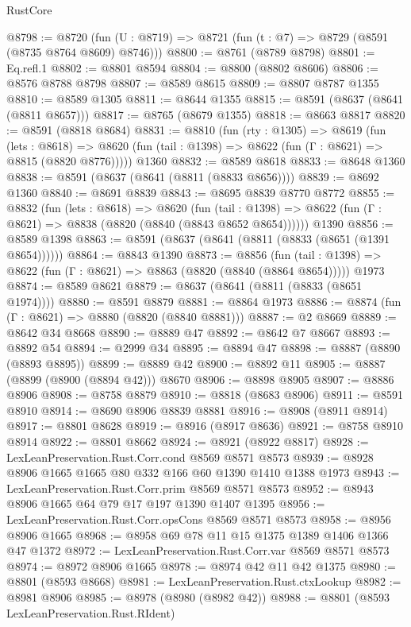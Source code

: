 \begin{lexlean}{RustCore}
\begin{coremodule}
@8798 := @8720 (fun (U : @8719) => @8721 (fun (t : @7) => @8729 (@8591 (@8735 @8764 @8609) @8746)))
@8800 := @8761 (@8789 @8798)
@8801 := Eq.refl.{1}
@8802 := @8801 @8594
@8804 := @8800 (@8802 @8606)
@8806 := @8576 @8788 @8798
@8807 := @8589 @8615
@8809 := @8807 @8787 @1355
@8810 := @8589 @1305
@8811 := @8644 @1355
@8815 := @8591 (@8637 (@8641 (@8811 @8657)))
@8817 := @8765 (@8679 @1355)
@8818 := @8663 @8817
@8820 := @8591 (@8818 @8684)
@8831 := @8810
    (fun (rty : @1305) =>
    @8619
      (fun (lets : @8618) =>
      @8620 (fun (tail : @1398) => @8622 (fun (Γ : @8621) => @8815 (@8820 @8776)))))
    @1360
@8832 := @8589 @8618
@8833 := @8648 @1360
@8838 := @8591 (@8637 (@8641 (@8811 (@8833 @8656))))
@8839 := @8692 @1360
@8840 := @8691 @8839
@8843 := @8695 @8839 @8770 @8772
@8855 := @8832
    (fun (lets : @8618) =>
    @8620
      (fun (tail : @1398) => @8622 (fun (Γ : @8621) => @8838 (@8820 (@8840 (@8843 @8652 @8654))))))
    @1390
@8856 := @8589 @1398
@8863 := @8591 (@8637 (@8641 (@8811 (@8833 (@8651 (@1391 @8654))))))
@8864 := @8843 @1390
@8873 := @8856
    (fun (tail : @1398) => @8622 (fun (Γ : @8621) => @8863 (@8820 (@8840 (@8864 @8654)))))
    @1973
@8874 := @8589 @8621
@8879 := @8637 (@8641 (@8811 (@8833 (@8651 @1974))))
@8880 := @8591 @8879
@8881 := @8864 @1973
@8886 := @8874 (fun (Γ : @8621) => @8880 (@8820 (@8840 @8881)))
@8887 := @2 @8669
@8889 := @8642 @34 @8668
@8890 := @8889 @47
@8892 := @8642 @7 @8667
@8893 := @8892 @54
@8894 := @2999 @34
@8895 := @8894 @47
@8898 := @8887 (@8890 (@8893 @8895))
@8899 := @8889 @42
@8900 := @8892 @11
@8905 := @8887 (@8899 (@8900 (@8894 @42))) @8670
@8906 := @8898 @8905
@8907 := @8886 @8906
@8908 := @8758 @8879
@8910 := @8818 (@8683 @8906)
@8911 := @8591 @8910
@8914 := @8690 @8906 @8839 @8881
@8916 := @8908 (@8911 @8914)
@8917 := @8801 @8628
@8919 := @8916 (@8917 @8636)
@8921 := @8758 @8910 @8914
@8922 := @8801 @8662
@8924 := @8921 (@8922 @8817)
@8928 := LexLeanPreservation.Rust.Corr.cond @8569 @8571 @8573
@8939 := @8928 @8906 @1665 @1665 @80 @332 @166 @60 @1390 @1410 @1388 @1973
@8943 := LexLeanPreservation.Rust.Corr.prim @8569 @8571 @8573
@8952 := @8943 @8906 @1665 @64 @79 @17 @197 @1390 @1407 @1395
@8956 := LexLeanPreservation.Rust.Corr.opsCons @8569 @8571 @8573
@8958 := @8956 @8906 @1665
@8968 := @8958 @69 @78 @11 @15 @1375 @1389 @1406 @1366 @47 @1372
@8972 := LexLeanPreservation.Rust.Corr.var @8569 @8571 @8573
@8974 := @8972 @8906 @1665
@8978 := @8974 @42 @11 @42 @1375
@8980 := @8801 (@8593 @8668)
@8981 := LexLeanPreservation.Rust.ctxLookup
@8982 := @8981 @8906
@8985 := @8978 (@8980 (@8982 @42))
@8988 := @8801 (@8593 LexLeanPreservation.Rust.RIdent)

\end{coremodule}
\end{lexlean}
